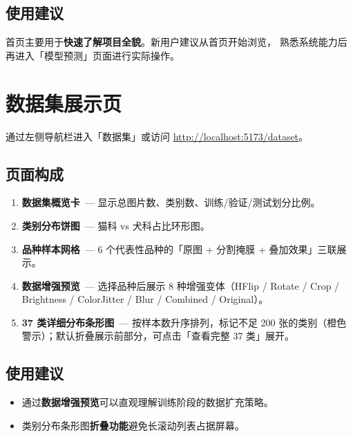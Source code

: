 \documentclass[12pt, a4paper, openany]{ctexbook}
\begin{document}
\section{使用建议}

首页主要用于\textbf{快速了解项目全貌}。新用户建议从首页开始浏览，
熟悉系统能力后再进入「模型预测」页面进行实际操作。

\chapter{数据集展示页}

通过左侧导航栏进入「数据集」或访问 \url{http://localhost:5173/dataset}。

\section{页面构成}

\begin{enumerate}[leftmargin=*]
  \item \textbf{数据集概览卡}\ — 显示总图片数、类别数、训练/验证/测试划分比例。
  \item \textbf{类别分布饼图}\ — 猫科 vs 犬科占比环形图。
  \item \textbf{品种样本网格}\ — 6 个代表性品种的「原图 + 分割掩膜 + 叠加效果」三联展示。
  \item \textbf{数据增强预览}\ — 选择品种后展示 8 种增强变体（HFlip / Rotate / Crop / Brightness / ColorJitter / Blur / Combined / Original）。
  \item \textbf{37 类详细分布条形图}\ — 按样本数升序排列，标记不足 200 张的类别（橙色警示）；默认折叠展示前部分，可点击「查看完整 37 类」展开。
\end{enumerate}

\section{使用建议}

\begin{tipbox}
\begin{itemize}
  \item 通过\textbf{数据增强预览}可以直观理解训练阶段的数据扩充策略。
  \item 类别分布条形图\textbf{折叠功能}避免长滚动列表占据屏幕。
\end{itemize}
\end{tipbox}
\end{document}
